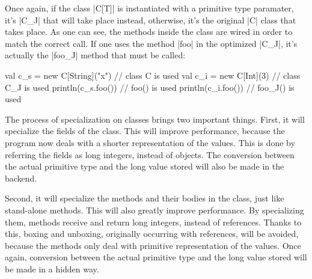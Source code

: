 Once again, if the class |C[T]| is instantiated with a primitive type paramater, it's |C_J| that will take place instead, otherwise, it's the original |C| class that takes place. As one can see, the methods inside the class are wired in order to match the correct call. If one uses the method |foo| in the optimized |C_J|, it's actually the |foo_J| method that must be called:

\begin{lstlisting-nobreak}
val c_s = new C[String]("x")  // class C is used
val c_i = new C[Int](3)               // class C_J is used
println(c_s.foo())   // foo() is used
println(c_i.foo())   // foo_J() is used
\end{lstlisting-nobreak}

The process of specialization on classes brings two important things. First, it will specialize the fields of the class. This will improve performance, because the program now deals with a shorter representation of the values. This is done by referring the fields as long integers, instead of objects. The conversion between the actual primitive type and the long value stored will also be made in the backend.

Second, it will specialize the methods and their bodies in the class, just like stand-alone methods. This will also greatly improve performance. By specializing them, methods receive and return long integers, instead of references. Thanks to this, boxing and unboxing, originally occurring with references, will be avoided, because the methods only deal with primitive representation of the values. Once again, conversion between the actual primitive type and the long value stored will be made in a hidden way.